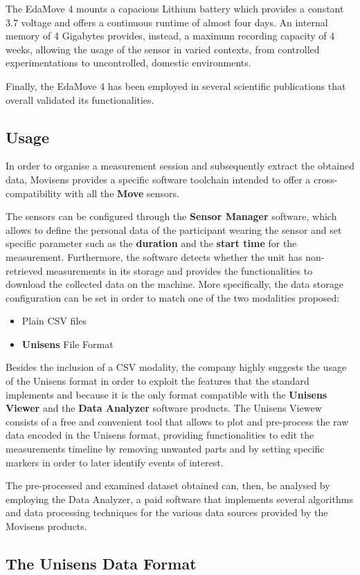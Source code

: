 The EdaMove 4 mounts a capacious Lithium battery which provides a constant 3.7 voltage and offers a continuous runtime of almost four days. An internal memory of 4 Gigabytes provides, instead, a maximum recording capacity of 4 weeks, allowing the usage of the sensor in varied contexts, from controlled experimentations to uncontrolled, domestic environments. 

Finally, the EdaMove 4 has been employed in several scientific publications that overall validated its functionalities.

\subsection{Usage}\label{subsec:edamove4-usage}

In order to organise a measurement session and subsequently extract the obtained data, Movisens provides a specific software toolchain intended to offer a cross-compatibility with all the \textbf{Move} sensors. 

The sensors can be configured through the \textbf{Sensor Manager} software, which allows to define the personal data of the participant wearing the sensor and set specific parameter such as the \textbf{duration} and the \textbf{start time} for the measurement. Furthermore, the software detects whether the unit has non-retrieved measurements in its storage and provides the functionalities to download the collected data on the machine. More specifically, the data storage configuration can be set in order to match one of the two modalities proposed: 

\begin{itemize}
    \item Plain CSV files
    \item \textbf{Unisens} File Format 
\end{itemize}

Besides the inclusion of a CSV modality, the company highly suggests the usage of the Unisens format in order to exploit the features that the standard implements and because it is the only format compatible with the \textbf{Unisens Viewer} and the \textbf{Data Analyzer} software products. The Unisens Viewew consists of a free and convenient tool that allows to plot and pre-process the raw data encoded in the Unisens format, providing functionalities to edit the measurements timeline by removing unwanted parts and by setting specific markers in order to later identify events of interest.

The pre-processed and examined dataset obtained can, then, be analysed by employing the Data Analyzer, a paid software that implements several algorithms and data processing techniques for the various data sources provided by the Movisens products.


\subsection{The Unisens Data Format}\label{subsec:unisens}




